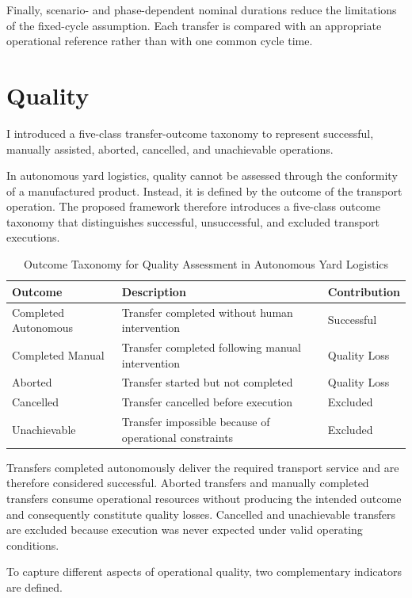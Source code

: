 Finally, scenario- and phase-dependent nominal durations reduce the limitations of the fixed-cycle assumption. Each transfer is compared with an appropriate operational reference rather than with one common cycle time.
\section{Quality}
I introduced a five-class transfer-outcome taxonomy to represent successful, manually assisted, aborted, cancelled, and unachievable operations.

In autonomous yard logistics, quality cannot be assessed through the conformity of a manufactured product. Instead, it is defined by the outcome of the transport operation. The proposed framework therefore introduces a five-class outcome taxonomy that distinguishes successful, unsuccessful, and excluded transport executions.

\begin{table}[H]
\small
\renewcommand{\arraystretch}{1.4}
\centering
\caption{Outcome Taxonomy for Quality Assessment in Autonomous Yard Logistics}
\label{tab:quality-outcome-taxonomy}
\begin{tabular}{|p{3.6cm}|p{6.1cm}|p{2.6cm}|}
\hline
\textbf{Outcome} & \textbf{Description} & \textbf{Contribution} \\
\hline
Completed Autonomous & Transfer completed without human intervention & Successful \\
\hline
Completed Manual & Transfer completed following manual intervention & Quality Loss \\
\hline
Aborted & Transfer started but not completed & Quality Loss \\
\hline
Cancelled & Transfer cancelled before execution & Excluded \\
\hline
Unachievable & Transfer impossible because of operational constraints & Excluded \\
\hline
\end{tabular}
\end{table}

Transfers completed autonomously deliver the required transport service and are therefore considered successful. Aborted transfers and manually completed transfers consume operational resources without producing the intended outcome and consequently constitute quality losses. Cancelled and unachievable transfers are excluded because execution was never expected under valid operating conditions.

To capture different aspects of operational quality, two complementary indicators are defined.


